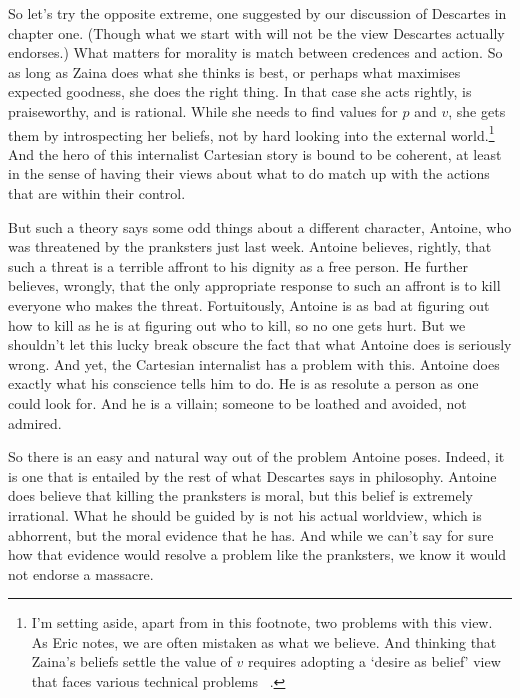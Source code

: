 So let's try the opposite extreme, one suggested by our discussion of Descartes in chapter one. (Though what we start with will not be the view Descartes actually endorses.) What matters for morality is match between credences and action. So as long as \gls{Zaina} does what she thinks is best, or perhaps what maximises expected goodness, she does the right thing. In that case she acts rightly, is praiseworthy, and is rational. While she needs to find values for $p$ and $v$, she gets them by introspecting her beliefs, not by hard looking into the external world.\footnote{I'm setting aside, apart from in this footnote, two problems with this view. As Eric \citet{Schwitzgebel2008} notes, we are often mistaken as what we believe. And thinking that \gls{Zaina}'s beliefs settle the value of $v$ requires adopting a `desire as belief' view that faces various technical problems ~\citep{Lewis1988b, Lewis1996b, RussellHawthorne2016}.} And the hero of this internalist Cartesian story is bound to be coherent, at least in the sense of having their views about what to do match up with the actions that are within their control.

But such a theory says some odd things about a different character, \gls{Antoine}, who was threatened by the pranksters just last week. \gls{Antoine} believes, rightly, that such a threat is a terrible affront to his dignity as a free person. He further believes, wrongly, that the only appropriate response to such an affront is to kill everyone who makes the threat. Fortuitously, \gls{Antoine} is as bad at figuring out how to kill as he is at figuring out who to kill, so no one gets hurt. But we shouldn't let this lucky break obscure the fact that what \gls{Antoine} does is seriously wrong. And yet, the Cartesian internalist has a problem with this. \gls{Antoine} does exactly what his conscience tells him to do. He is as resolute a person as one could look for. And he is a villain; someone to be loathed and avoided, not admired.

So there is an easy and natural way out of the problem \gls{Antoine} poses. Indeed, it is one that is entailed by the rest of what Descartes says in philosophy. \gls{Antoine} does believe that killing the pranksters is moral, but this belief is extremely irrational. What he should be guided by is not his actual worldview, which is abhorrent, but the moral evidence that he has. And while we can't say for sure how that evidence would resolve a problem like the pranksters, we know it would not endorse a massacre.

